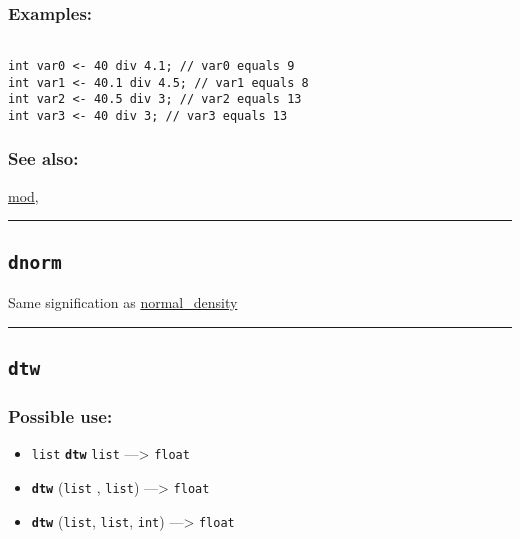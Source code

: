 \documentclass[]{book}
\providecommand{\tightlist}{%
  \setlength{\itemsep}{0pt}\setlength{\parskip}{0pt}}
\theoremstyle{definition}
\theoremstyle{definition}
\theoremstyle{definition}
\theoremstyle{remark}
\begin{document}
\subsubsection{Examples:}\label{examples-107}

\begin{verbatim}
 
int var0 <- 40 div 4.1; // var0 equals 9 
int var1 <- 40.1 div 4.5; // var1 equals 8 
int var2 <- 40.5 div 3; // var2 equals 13 
int var3 <- 40 div 3; // var3 equals 13
\end{verbatim}

\subsubsection{See also:}\label{see-also-84}

\href{OperatorsIM\#mod}{mod},

\begin{center}\rule{0.5\linewidth}{\linethickness}\end{center}

\subsection{\texorpdfstring{\texttt{dnorm}}{dnorm}}\label{dnorm}

Same signification as
\href{OperatorsNR\#normal_density}{normal\_density}

\begin{center}\rule{0.5\linewidth}{\linethickness}\end{center}

\subsection{\texorpdfstring{\texttt{dtw}}{dtw}}\label{dtw}

\subsubsection{Possible use:}\label{possible-use-141}

\begin{itemize}
\tightlist
\item
  \texttt{list} \textbf{\texttt{dtw}} \texttt{list} ---\textgreater{}
  \texttt{float}
\item
  \textbf{\texttt{dtw}} (\texttt{list} , \texttt{list})
  ---\textgreater{} \texttt{float}
\item
  \textbf{\texttt{dtw}} (\texttt{list}, \texttt{list}, \texttt{int})
  ---\textgreater{} \texttt{float}
\end{itemize}
\end{document}
